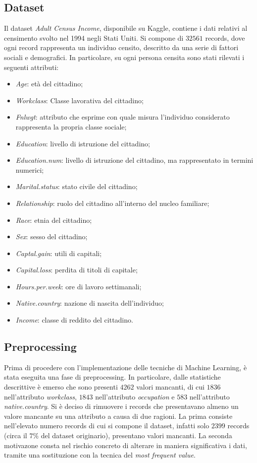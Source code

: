 \documentclass[fleqn,10pt]{SelfArx}
\begin{document}
\subsection{Dataset}
Il dataset \textit{Adult Census Income}, disponibile su Kaggle, contiene i dati relativi al censimento svolto nel 1994 negli Stati Uniti. Si compone di $\num{32561}$ records, dove ogni record rappresenta un individuo censito, descritto da una serie di fattori sociali e demografici. In particolare, su ogni persona censita sono stati rilevati i seguenti attributi:
\begin{itemize}
    \item \textit{Age}: età del cittadino;
    \item \textit{Workclass}: Classe lavorativa del cittadino;
    \item \textit{Fnlwgt}: attributo che esprime con quale misura l'individuo considerato rappresenta la propria classe sociale;
    \item \textit{Education}: livello di istruzione del cittadino;
    \item \textit{Education.num}: livello di istruzione del cittadino, ma rappresentato in termini numerici;
    \item \textit{Marital.status}: stato civile del cittadino;
    \item \textit{Relationship}: ruolo del cittadino all'interno del nucleo familiare;
    \item \textit{Race}: etnia del cittadino;
    \item \textit{Sex}: sesso del cittadino;
    \item \textit{Captal.gain}: utili di capitali;
    \item \textit{Capital.loss}: perdita di titoli di capitale;
    \item \textit{Hours.per.week}: ore di lavoro settimanali;
    \item \textit{Native.country}: nazione di nascita dell'individuo;
    \item \textit{Income}: classe di reddito del cittadino.
    
\end{itemize}
\subsection{Preprocessing}
Prima di procedere con l'implementazione delle tecniche di Machine Learning, è stata eseguita una fase di preprocessing. In particolare, dalle statistiche descrittive è emerso che sono presenti $\num{4262}$ valori mancanti, di cui $\num{1836}$ nell'attributo \textit{workclass}, $\num{1843}$ nell'attributo \textit{occupation} e $\num{583}$ nell'attributo \textit{native.country}. Si è deciso di rimuovere i records che presentavano almeno un valore mancante su una attributo a causa di due ragioni. La prima consiste nell'elevato numero records di cui si compone il dataset, infatti solo $\num{2399}$ records (circa il $7\%$ del dataset originario), presentano valori mancanti. La seconda motivazone consta nel rischio concreto di alterare in maniera significativa i dati, tramite una sostituzione con la tecnica del \textit{most frequent value}.
\end{document}
